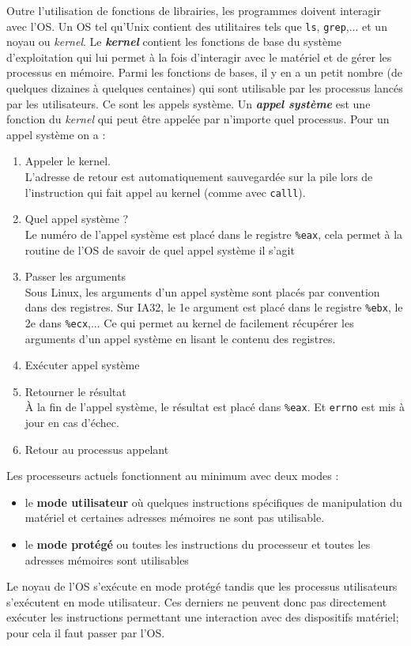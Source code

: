 Outre l'utilisation de fonctions de librairies, les programmes doivent interagir avec l'OS.
Un OS tel qu'Unix contient des utilitaires tels que \texttt{ls}, \texttt{grep},...
et un noyau ou \textit{kernel}.
Le \textit{\textbf{kernel}} contient les fonctions de base du système d'exploitation qui lui permet à la fois d'interagir avec le matériel et de gérer les processus en mémoire.
Parmi les fonctions de bases, il y en a un petit nombre (de quelques dizaines à quelques centaines) qui sont utilisable par les processus lancés par les utilisateurs.
Ce sont les appels système.
Un \textbf{\textit{appel système}} est une fonction du \textit{kernel} qui peut être appelée par n'importe quel processus.
Pour un appel système on a :
\begin{enumerate}
  \item Appeler le kernel.\\
    L'adresse de retour est automatiquement sauvegardée sur la pile lors de l'instruction qui fait appel au kernel (comme avec \texttt{calll}).
  \item Quel appel système ? \\
    Le numéro de l'appel système est placé dans le registre \texttt{\%eax}, cela permet à la routine de l'OS de savoir de quel appel système il s'agit
  \item Passer les arguments \\
    Sous Linux, les arguments d'un appel système sont placés par convention dans des registres.
    Sur IA32, le 1e argument est placé dans le registre \texttt{\%ebx}, le 2e dans \texttt{\%ecx},...
    Ce qui permet au kernel de facilement récupérer les arguments d'un appel système en lisant le contenu des registres.
  \item Exécuter appel système
  \item Retourner le résultat\\
    À la fin de l'appel système, le résultat est placé dans \texttt{\%eax}.
    Et \texttt{errno} est mis à jour en cas d'échec.
  \item Retour au processus appelant
\end{enumerate}

Les processeurs actuels fonctionnent au minimum avec deux modes :
\begin{itemize}
  \item le \textbf{mode utilisateur} où quelques instructions spécifiques de manipulation du matériel et certaines adresses mémoires ne sont pas utilisable.
  \item le \textbf{mode protégé} ou toutes les instructions du processeur et toutes les adresses mémoires sont utilisables
\end{itemize}
Le noyau de l'OS s'exécute en mode protégé tandis que les processus utilisateurs s'exécutent en mode utilisateur.
Ces derniers ne peuvent donc pas directement exécuter les instructions permettant une interaction avec des dispositifs matériel; pour cela il faut passer par l'OS.

